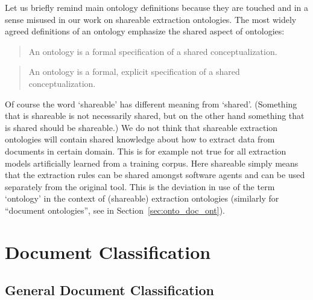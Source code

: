 Let us briefly remind main ontology definitions because they are touched and in a sense misused in our work on shareable extraction ontologies. The most widely agreed definitions of an ontology emphasize the shared aspect of ontologies: 
\begin{quote}
An ontology is a formal specification of a shared conceptualization.	\citep{so17864}
\end{quote}

\begin{quote}
An ontology is a formal, explicit specification of a shared conceptualization. \citep{Studer1998161}
\end{quote}

Of course the word `shareable' has different meaning from `shared'. (Something that is shareable is not necessarily shared, but on the other hand something that is shared should be shareable.) We do not think that shareable extraction ontologies will contain shared knowledge about how to extract data from documents in certain domain. This is for example not true for all extraction models artificially learned from a training corpus. Here shareable simply means that the extraction rules can be shared amongst software agents and can be used separately from the original tool. This is the deviation in use of the term `ontology' in the context of (shareable) extraction ontologies (similarly for ``document ontologies'', see in Section~\ref{sec:onto_doc_ont}).






\section{Document Classification} \label{sec:relwork_doc_classification} 

\subsection{General Document Classification}

